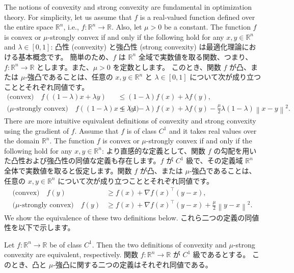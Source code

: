 \documentclass[0_main]{subfiles}
\begin{document}
\ifEn
    The notions of convexity and strong convexity are fundamental in optimization theory.
    For simplicity, let us assume that $f$ is a real-valued function defined over the entire space $\mathbb{R}^n$, i.e., $f \colon \mathbb{R}^n \to \mathbb{R}$.
    Also, let $\mu>0$ be a constant.
    The function $f$ is convex or $\mu$-strongly convex if and only if the following hold for any $x,y \in \mathbb{R}^n$ and $\lambda \in [0,1]$:
\else
    凸性 (convexity) と強凸性 (strong convexity) は最適化理論における基本概念です。
    簡単のため、$f$ は $\mathbb{R}^n$ 全域で実数値を取る関数、つまり、$f \colon \mathbb{R}^n \to \mathbb{R}$ とします。また、$\mu>0$ を定数とします。
    このとき、関数 $f$ が凸、または $\mu$-強凸であることは、任意の $x,y \in \mathbb{R}^n$ と $\lambda \in [0,1]$ について次が成り立つこととそれぞれ同値です。
\fi
\begin{align*}
    \textrm{(convex)} \quad
    f((1-\lambda) x + \lambda y)                                        & \le (1-\lambda) f(x) + \lambda f(y),                                                                    \\
    \textrm{($\mu$-strongly convex)} \quad f((1-\lambda) x + \lambda y) & \le (1-\lambda) f(x) + \lambda f(y) - \frac{\mu}{2} \lambda (1-\lambda) \left\lVert x-y \right\rVert^2.
\end{align*}
\ifEn
    There are more intuitive equivalent definitions of convexity and strong convexity using the gradient of $f$. Assume that $f$ is of class $C^1$ and it takes real values over the domain $\mathbb{R}^n$. The function $f$ is convex or $\mu$-strongly convex if and only if the following hold for any $x,y \in \mathbb{R}^n$:
\else
    より直感的な定義として、関数 $f$ の勾配を用いた凸性および強凸性の同値な定義も存在します。$f$ が $C^1$ 級で、その定義域 $\mathbb{R}^n$ 全体で実数値を取ると仮定します。関数 $f$ が凸、または $\mu$-強凸であることは、任意の $x,y \in \mathbb{R}^n$ について次が成り立つこととそれぞれ同値です。
\fi
\begin{align*}
    \textrm{(convex)} \quad
    f(y) & \ge f(x)+\nabla f(x)^\top (y-x),                                             \\
    \textrm{($\mu$-strongly convex)} \quad
    f(y) & \ge f(x)+\nabla f(x)^\top (y-x)+\frac{\mu}{2}\left\lVert y-x \right\rVert^2.
\end{align*}
\ifEn
    We show the equivalence of these two definitions below.
\else
    これら二つの定義の同値性を以下で示します。
\fi
\begin{proposition}
    \ifEn
        Let $f \colon \mathbb{R}^n \to \mathbb{R}$ be of class $C^1$. Then the two definitions of convexity and $\mu$-strong convexity are equivalent, respectively.
    \else
        関数 $f \colon \mathbb{R}^n \to \mathbb{R}$ が $C^1$ 級であるとする。
        このとき、凸と $\mu$-強凸に関する二つの定義はそれぞれ同値である。
    \fi
\end{proposition}
\end{document}
